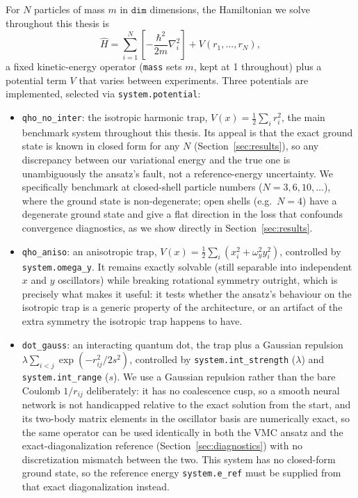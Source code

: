 \documentclass[a4paper,11pt,twoside]{article}
\begin{document}
For $N$ particles of mass $m$ in $\texttt{dim}$ dimensions, the Hamiltonian we solve throughout this thesis is
\begin{equation}
\label{eq:hamiltonian}
\hat{H} = \sum_{i=1}^{N} \left[ -\frac{\hbar^{2}}{2m}\nabla_i^{2} \right] + V(r_1,...,r_N),
\end{equation}
a fixed kinetic-energy operator (\texttt{mass} sets $m$, kept at 1 throughout) plus a potential term $V$ that varies between experiments. Three potentials are implemented, selected via \texttt{system.potential}:
\begin{itemize}
    \item \texttt{qho\_no\_inter}: the isotropic harmonic trap, $V(x) = \frac{1}{2}\sum_i r_i^2$, the main benchmark system throughout this thesis. Its appeal is that the exact ground state is known in closed form for any $N$ (Section~\ref{sec:results}), so any discrepancy between our variational energy and the true one is unambiguously the ansatz's fault, not a reference-energy uncertainty. We specifically benchmark at closed-shell particle numbers ($N=3,6,10,\dots$), where the ground state is non-degenerate; open shells (e.g.\ $N=4$) have a degenerate ground state and give a flat direction in the loss that confounds convergence diagnostics, as we show directly in Section~\ref{sec:results}.
    \item \texttt{qho\_aniso}: an anisotropic trap, $V(x) = \frac{1}{2}\sum_i (x_i^2 + \omega_y^2 y_i^2)$, controlled by \texttt{system.omega\_y}. It remains exactly solvable (still separable into independent $x$ and $y$ oscillators) while breaking rotational symmetry outright, which is precisely what makes it useful: it tests whether the ansatz's behaviour on the isotropic trap is a generic property of the architecture, or an artifact of the extra symmetry the isotropic trap happens to have.
    \item \texttt{dot\_gauss}: an interacting quantum dot, the trap plus a Gaussian repulsion $\lambda \sum_{i<j} \exp(-r_{ij}^2/2s^2)$, controlled by \texttt{system.int\_strength} ($\lambda$) and \texttt{system.int\_range} ($s$). We use a Gaussian repulsion rather than the bare Coulomb $1/r_{ij}$ deliberately: it has no coalescence cusp, so a smooth neural network is not handicapped relative to the exact solution from the start, and its two-body matrix elements in the oscillator basis are numerically exact, so the same operator can be used identically in both the VMC ansatz and the exact-diagonalization reference (Section~\ref{sec:diagnostics}) with no discretization mismatch between the two. This system has no closed-form ground state, so the reference energy \texttt{system.e\_ref} must be supplied from that exact diagonalization instead.
\end{itemize}
\end{document}
